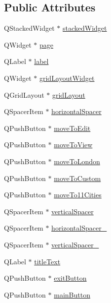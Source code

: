 \subsection*{Public Attributes}
\begin{DoxyCompactItemize}
\item 
Q\+Stacked\+Widget $\ast$ \mbox{\hyperlink{class_ui___main_window_a8d440a6df1de0bc57afcdda7476d8f19}{stacked\+Widget}}
\item 
Q\+Widget $\ast$ \mbox{\hyperlink{class_ui___main_window_ad7d164376bef8649ee1f94697b859417}{page}}
\item 
Q\+Label $\ast$ \mbox{\hyperlink{class_ui___main_window_ad9c89133780f28e6efa2ec17ceb9cff5}{label}}
\item 
Q\+Widget $\ast$ \mbox{\hyperlink{class_ui___main_window_a08a857edea57a9e53915f22187c06813}{grid\+Layout\+Widget}}
\item 
Q\+Grid\+Layout $\ast$ \mbox{\hyperlink{class_ui___main_window_a525ed3c5fe0784ac502ee222fba4e205}{grid\+Layout}}
\item 
Q\+Spacer\+Item $\ast$ \mbox{\hyperlink{class_ui___main_window_a7871ea8c4b6c595d7ccd53960b344719}{horizontal\+Spacer}}
\item 
Q\+Push\+Button $\ast$ \mbox{\hyperlink{class_ui___main_window_a4a943d530aef96076993420fbe8008aa}{move\+To\+Edit}}
\item 
Q\+Push\+Button $\ast$ \mbox{\hyperlink{class_ui___main_window_ad9801547cfce7c5d19b427123105f0b2}{move\+To\+View}}
\item 
Q\+Push\+Button $\ast$ \mbox{\hyperlink{class_ui___main_window_ae68791a82316a972b14e8a8f16eb377c}{move\+To\+London}}
\item 
Q\+Push\+Button $\ast$ \mbox{\hyperlink{class_ui___main_window_a3e9ac52f326b4e72f38cf05903b00cd7}{move\+To\+Custom}}
\item 
Q\+Push\+Button $\ast$ \mbox{\hyperlink{class_ui___main_window_ab038373e7752969160cec00fd5cc24da}{move\+To11\+Cities}}
\item 
Q\+Spacer\+Item $\ast$ \mbox{\hyperlink{class_ui___main_window_a8384329c3663ff274e926a12024aab52}{vertical\+Spacer}}
\item 
Q\+Spacer\+Item $\ast$ \mbox{\hyperlink{class_ui___main_window_a9a022556cf8ce3fa47e51d79cb222ab0}{horizontal\+Spacer\+\_}}
\item 
Q\+Spacer\+Item $\ast$ \mbox{\hyperlink{class_ui___main_window_adc1f5fdd97fb3729999c56902d0fa591}{vertical\+Spacer\+\_}}
\item 
Q\+Label $\ast$ \mbox{\hyperlink{class_ui___main_window_a892390c810f5c91a93dc843de90cf433}{title\+Text}}
\item 
Q\+Push\+Button $\ast$ \mbox{\hyperlink{class_ui___main_window_a0a94b420ba46214964527b8bbdf424ad}{exit\+Button}}
\item 
Q\+Push\+Button $\ast$ \mbox{\hyperlink{class_ui___main_window_a5c315d3186a5bca7e7d71fb3c41057b3}{main\+Button}}
\end{DoxyCompactItemize}


